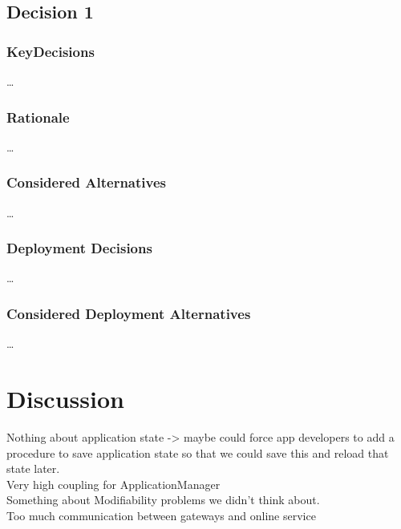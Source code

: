     \subsection{Decision 1}
    \subsubsection*{KeyDecisions}
    \ldots
    \subsubsection*{Rationale}
    \ldots
    \subsubsection*{Considered Alternatives}
    \ldots
    \subsubsection*{Deployment Decisions}
    \ldots
    \subsubsection*{Considered Deployment Alternatives}
    \ldots

\section{Discussion}
    Nothing about application state -> maybe could force app developers to add a procedure to save application state so that we could save this and reload that state later.\\
    Very high coupling for ApplicationManager\\
    Something about Modifiability problems we didn't think about.\\
    Too much communication between gateways and online service
